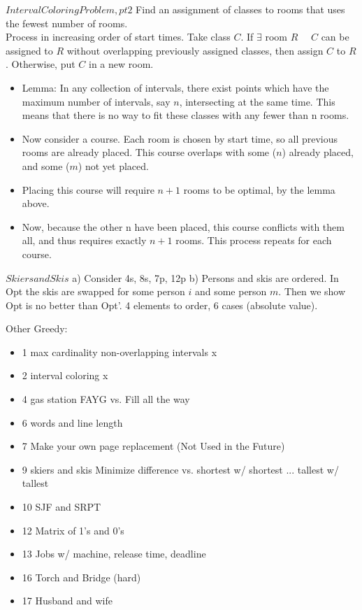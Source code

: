 \documentclass[12pt]{article}
\providecommand{\st}{\ \text{s.t.}\ }
\begin{document}
$Interval Coloring Problem, pt 2$
Find an assignment of classes to rooms that uses the fewest number of rooms.\\
Process in increasing order of start times. Take class $C$. If $\exists$ room $R$ \st $C$ can be assigned to $R$ without overlapping previously assigned classes, then assign $C$ to $R$. Otherwise, put $C$ in a new room.
\begin{itemize}
  \item Lemma: In any collection of intervals, there exist points which have the maximum number of intervals, say $n$, intersecting at the same time. This means that there is no way to fit these classes with any fewer than n rooms.
  \item Now consider a course. Each room is chosen by start time, so all previous rooms are already placed.
	This course overlaps with some ($n$) already placed, and some ($m$) not yet placed.
	\item Placing this course will require $n+1$ rooms to be optimal, by the lemma above.
	\item Now, because the other n have been placed, this course conflicts with them all, and thus requires exactly $n+1$ rooms. This process repeats for each course.
\end{itemize}


$Skiers and Skis$
a) Consider 4s, 8s, 7p, 12p
b) Persons and skis are ordered. In Opt the skis are swapped for some person $i$ and some person $m$. Then we show Opt is no better than Opt'. 4 elements to order, 6 cases (absolute value).



Other Greedy:
\begin{itemize}
  \item 1 max cardinality non-overlapping intervals   x
  \item 2 interval coloring                           x
  \item 4 gas station
          FAYG vs. Fill all the way
  \item 6 words and line length
  \item 7 Make your own page replacement (Not Used in the Future)
  \item 9 skiers and skis
          Minimize difference vs. shortest w/ shortest ... tallest w/ tallest
  \item 10 SJF and SRPT
  \item 12 Matrix of 1's and 0's
  \item 13 Jobs w/ machine, release time, deadline
  \item 16 Torch and Bridge (hard)
  \item 17 Husband and wife
\end{itemize}
\end{document}
